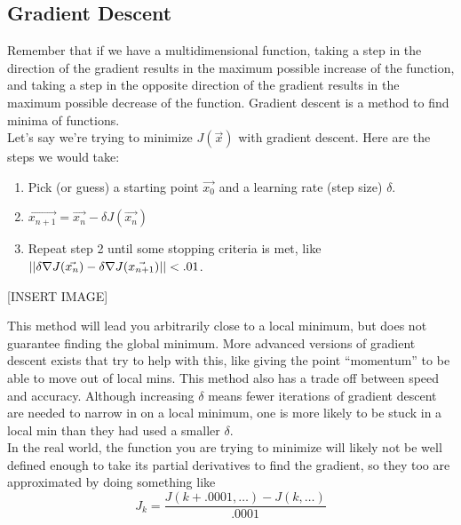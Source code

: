 \subsection{Gradient Descent}
\noindent
Remember that if we have a multidimensional function, taking a step in the direction of the gradient results in the maximum possible increase of the function, and taking a step in the opposite direction of the gradient results in the maximum possible decrease of the function. Gradient descent is a method to find minima of functions.\\

\noindent
Let's say we're trying to minimize $J(\vec{x})$ with gradient descent. Here are the steps we would take:
\begin{enumerate}
	\item Pick (or guess) a starting point $\vec{x_0}$ and a learning rate (step size) $\delta$.
	\item $\vec{x_{n+1}} = \vec{x_n} - \delta J(\vec{x_n})$
	\item Repeat step 2 until some stopping criteria is met, like $\left|\left|\delta \nabla J(\vec{x_n}) - \delta \nabla J(\vec{x_{n+1}})\right|\right|<.01$.
\end{enumerate}

[INSERT IMAGE]

\noindent
This method will lead you arbitrarily close to a local minimum, but does not guarantee finding the global minimum. More advanced versions of gradient descent exists that try to help with this, like giving the point “momentum” to be able to move out of local mins.
This method also has a trade off between speed and accuracy. Although increasing $\delta$ means fewer iterations of gradient descent are needed to narrow in on a local minimum, one is more likely to be stuck in a local min than they had used a smaller $\delta$.\\

\noindent
In the real world, the function you are trying to minimize will likely not be well defined enough to take its partial derivatives to find the gradient, so they too are approximated by doing something like
\begin{equation*}
	J_{k} = \frac{J(k+.0001, \ldots) - J(k, \ldots)}{.0001}
\end{equation*}